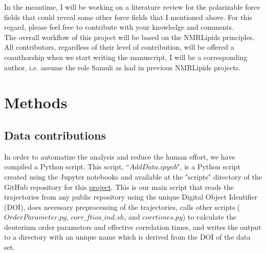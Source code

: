 \documentclass[12pt]{article}
\begin{document}

In the meantime, I will be working on a literature review for the polarizable force fields that could reveal some other force fields that I mentioned above. For this regard, please feel free to contribute with your knowledge and comments.\\

The overall workflow of this project will be based on the NMRLipids principles. All contributors, regardless of their level of contribution, will be offered a coauthorship when we start writing the manuscript. I will be a corresponding author, i.e. assume the role Samuli as had in previous NMRLipids projects.\\

\section{Methods}
\subsection{Data contributions}

In order to automatize the analysis and reduce the human effort, we have compiled a Python script. This script, ``$AddData.ipynb$", is a Python script created using the Jupyter notebooks and available at the "scripts" directory of the GitHub repository for this \href{https://github.com/NMRLipids/NMRlipidsVIpolarizableFFs}{project}. This is our main script that reads the trajectories from any public repository using the unique Digital Object Identifier (DOI), does necessary preprocessing of the trajectories, calls other scripts ($OrderParameter.py$, $corr\_ftios\_ind.sh$, and $corrtimes.py$) to calculate the deuterium order parameters and effective correlation times, and writes the output to a directory with an unique name which is derived from the DOI of the data set. \\
\end{document}
